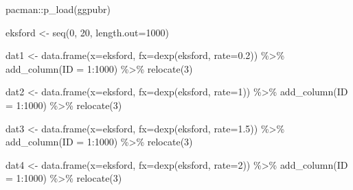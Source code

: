 \documentclass[
]{book}
\newenvironment{Shaded}{\begin{snugshade}}{\end{snugshade}}
\newcommand{\AttributeTok}[1]{\textcolor[rgb]{0.77,0.63,0.00}{#1}}
\newcommand{\DecValTok}[1]{\textcolor[rgb]{0.00,0.00,0.81}{#1}}
\newcommand{\FloatTok}[1]{\textcolor[rgb]{0.00,0.00,0.81}{#1}}
\newcommand{\FunctionTok}[1]{\textcolor[rgb]{0.00,0.00,0.00}{#1}}
\newcommand{\NormalTok}[1]{#1}
\newcommand{\OtherTok}[1]{\textcolor[rgb]{0.56,0.35,0.01}{#1}}
\newcommand{\SpecialCharTok}[1]{\textcolor[rgb]{0.00,0.00,0.00}{#1}}
\begin{document}
\begin{Shaded}
\begin{Highlighting}[]
\NormalTok{pacman}\SpecialCharTok{::}\FunctionTok{p\_load}\NormalTok{(ggpubr)}

\NormalTok{eksford }\OtherTok{\textless{}{-}} \FunctionTok{seq}\NormalTok{(}\DecValTok{0}\NormalTok{, }\DecValTok{20}\NormalTok{, }\AttributeTok{length.out=}\DecValTok{1000}\NormalTok{)}

\NormalTok{dat1 }\OtherTok{\textless{}{-}} \FunctionTok{data.frame}\NormalTok{(}\AttributeTok{x=}\NormalTok{eksford, }\AttributeTok{fx=}\FunctionTok{dexp}\NormalTok{(eksford, }\AttributeTok{rate=}\FloatTok{0.2}\NormalTok{)) }\SpecialCharTok{\%\textgreater{}\%}
  \FunctionTok{add\_column}\NormalTok{(}\AttributeTok{ID =} \DecValTok{1}\SpecialCharTok{:}\DecValTok{1000}\NormalTok{) }\SpecialCharTok{\%\textgreater{}\%}
  \FunctionTok{relocate}\NormalTok{(}\DecValTok{3}\NormalTok{)}
             
\NormalTok{dat2 }\OtherTok{\textless{}{-}} \FunctionTok{data.frame}\NormalTok{(}\AttributeTok{x=}\NormalTok{eksford, }\AttributeTok{fx=}\FunctionTok{dexp}\NormalTok{(eksford, }\AttributeTok{rate=}\DecValTok{1}\NormalTok{)) }\SpecialCharTok{\%\textgreater{}\%}
  \FunctionTok{add\_column}\NormalTok{(}\AttributeTok{ID =} \DecValTok{1}\SpecialCharTok{:}\DecValTok{1000}\NormalTok{) }\SpecialCharTok{\%\textgreater{}\%}
  \FunctionTok{relocate}\NormalTok{(}\DecValTok{3}\NormalTok{)}
             
\NormalTok{dat3 }\OtherTok{\textless{}{-}} \FunctionTok{data.frame}\NormalTok{(}\AttributeTok{x=}\NormalTok{eksford, }\AttributeTok{fx=}\FunctionTok{dexp}\NormalTok{(eksford, }\AttributeTok{rate=}\FloatTok{1.5}\NormalTok{)) }\SpecialCharTok{\%\textgreater{}\%}
  \FunctionTok{add\_column}\NormalTok{(}\AttributeTok{ID =} \DecValTok{1}\SpecialCharTok{:}\DecValTok{1000}\NormalTok{) }\SpecialCharTok{\%\textgreater{}\%}
  \FunctionTok{relocate}\NormalTok{(}\DecValTok{3}\NormalTok{)}
             
\NormalTok{dat4 }\OtherTok{\textless{}{-}} \FunctionTok{data.frame}\NormalTok{(}\AttributeTok{x=}\NormalTok{eksford, }\AttributeTok{fx=}\FunctionTok{dexp}\NormalTok{(eksford, }\AttributeTok{rate=}\DecValTok{2}\NormalTok{)) }\SpecialCharTok{\%\textgreater{}\%}
  \FunctionTok{add\_column}\NormalTok{(}\AttributeTok{ID =} \DecValTok{1}\SpecialCharTok{:}\DecValTok{1000}\NormalTok{) }\SpecialCharTok{\%\textgreater{}\%}
  \FunctionTok{relocate}\NormalTok{(}\DecValTok{3}\NormalTok{)}
             


\end{Highlighting}
\end{Shaded}
\end{document}
